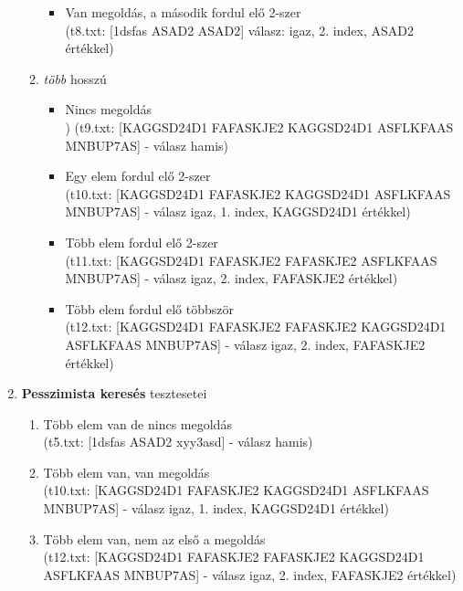 \documentclass[12pt,a4paper]{article}			%
\begin{document}
\begin{enumerate}
\begin{enumerate}
\begin{itemize}[label={}]
					\item Van megoldás, a második fordul elő 2-szer\\
					(t8.txt: [1dsfas ASAD2 ASAD2] válasz: igaz, 2. index, ASAD2 értékkel)
				\end{itemize}
				\item \textit{több} hosszú
				\begin{itemize}[label={}]
					\item Nincs megoldás\\)
					(t9.txt: [KAGGSD24D1 FAFASKJE2  KAGGSD24D1 ASFLKFAAS MNBUP7AS] - válasz hamis)
					\item Egy elem fordul elő 2-szer\\
					(t10.txt: [KAGGSD24D1 FAFASKJE2  KAGGSD24D1 ASFLKFAAS MNBUP7AS] - válasz igaz, 1. index, KAGGSD24D1 értékkel)
					\item Több elem fordul elő 2-szer\\
					(t11.txt: [KAGGSD24D1 FAFASKJE2 FAFASKJE2 ASFLKFAAS MNBUP7AS] - válasz igaz, 2. index, FAFASKJE2 értékkel)
					\item Több elem fordul elő többször\\
					(t12.txt: [KAGGSD24D1 FAFASKJE2 FAFASKJE2 KAGGSD24D1 ASFLKFAAS MNBUP7AS] - válasz igaz, 2. index, FAFASKJE2 értékkel)
				\end{itemize}
			\end{enumerate}
			\item \textbf{Pesszimista keresés} tesztesetei
				\begin{enumerate}
					\item Több  elem van de nincs megoldás\\
					(t5.txt: [1dsfas ASAD2 xyy3asd] - válasz hamis)
					\item Több elem van, van megoldás\\
					(t10.txt: [KAGGSD24D1 FAFASKJE2  KAGGSD24D1 ASFLKFAAS MNBUP7AS] - válasz igaz, 1. index, KAGGSD24D1 értékkel)
					\item Több elem van, nem az első a megoldás\\
					(t12.txt: [KAGGSD24D1 FAFASKJE2 FAFASKJE2 KAGGSD24D1 ASFLKFAAS MNBUP7AS] - válasz igaz, 2. index, FAFASKJE2 értékkel)
				\end{enumerate}
		\end{enumerate}
\end{document}

